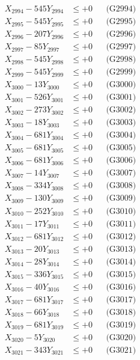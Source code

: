\documentclass[a4paper,10pt]{article}
\begin{document}
{\begin{align}
X_{2994} - 545Y_{2994} &\leq +0 && \text{(G2994)} \\
X_{2995} - 545Y_{2995} &\leq +0 && \text{(G2995)} \\
X_{2996} - 207Y_{2996} &\leq +0 && \text{(G2996)} \\
X_{2997} - 85Y_{2997} &\leq +0 && \text{(G2997)} \\
X_{2998} - 545Y_{2998} &\leq +0 && \text{(G2998)} \\
X_{2999} - 545Y_{2999} &\leq +0 && \text{(G2999)} \\
X_{3000} - 13Y_{3000} &\leq +0 && \text{(G3000)} \\
\allowbreak
X_{3001} - 526Y_{3001} &\leq +0 && \text{(G3001)} \\
X_{3002} - 273Y_{3002} &\leq +0 && \text{(G3002)} \\
X_{3003} - 18Y_{3003} &\leq +0 && \text{(G3003)} \\
X_{3004} - 681Y_{3004} &\leq +0 && \text{(G3004)} \\
X_{3005} - 681Y_{3005} &\leq +0 && \text{(G3005)} \\
X_{3006} - 681Y_{3006} &\leq +0 && \text{(G3006)} \\
X_{3007} - 14Y_{3007} &\leq +0 && \text{(G3007)} \\
X_{3008} - 334Y_{3008} &\leq +0 && \text{(G3008)} \\
X_{3009} - 130Y_{3009} &\leq +0 && \text{(G3009)} \\
X_{3010} - 252Y_{3010} &\leq +0 && \text{(G3010)} \\
\allowbreak
X_{3011} - 17Y_{3011} &\leq +0 && \text{(G3011)} \\
X_{3012} - 681Y_{3012} &\leq +0 && \text{(G3012)} \\
X_{3013} - 20Y_{3013} &\leq +0 && \text{(G3013)} \\
X_{3014} - 28Y_{3014} &\leq +0 && \text{(G3014)} \\
X_{3015} - 336Y_{3015} &\leq +0 && \text{(G3015)} \\
X_{3016} - 40Y_{3016} &\leq +0 && \text{(G3016)} \\
X_{3017} - 681Y_{3017} &\leq +0 && \text{(G3017)} \\
X_{3018} - 66Y_{3018} &\leq +0 && \text{(G3018)} \\
X_{3019} - 681Y_{3019} &\leq +0 && \text{(G3019)} \\
X_{3020} - 5Y_{3020} &\leq +0 && \text{(G3020)} \\
\allowbreak
X_{3021} - 343Y_{3021} &\leq +0 && \text{(G3021)} \\

\end{align}}
\end{document}
